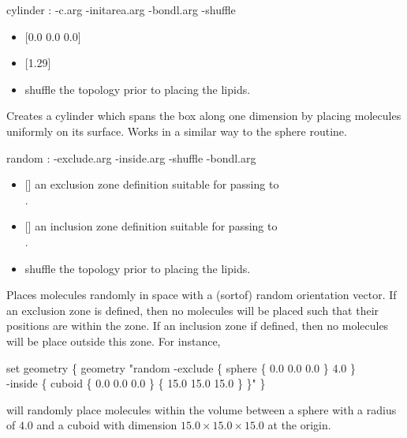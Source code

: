 \begin{code}
  cylinder : -c.arg -initarea.arg -bondl.arg -shuffle
\end{code}
\begin{itemize}
\item {} [{0.0 0.0 0.0}]
\item {} [1.29]
\item {} shuffle the topology prior to placing the lipids.
\end{itemize}
Creates a cylinder which spans the box along one dimension by placing
molecules uniformly on its surface. Works in a similar way to the
sphere routine.

\begin{code}
  random : -exclude.arg -inside.arg -shuffle -bondl.arg
\end{code}
\begin{itemize}
  \item {} [] an exclusion zone definition suitable for passing to\\
 .
  \item {} [] an inclusion zone definition suitable for passing to\\
 .
  \item {} shuffle the topology prior to placing the lipids.
  \end{itemize}
  Places molecules randomly in space with a (sortof) random
  orientation vector. If an exclusion zone is defined, then no
  molecules will be placed such that their positions are within the
  zone. If an inclusion zone if defined, then no molecules will be
  place outside this zone. For instance,
\begin{code}
  set geometry \{ geometry "random -exclude \{ sphere \{ 0.0 0.0 0.0 \} 4.0 \}\\
                -inside \{ cuboid \{ 0.0 0.0 0.0 \} \{ 15.0 15.0 15.0 \} \}" \}\\
\end{code}
will randomly place molecules within the volume between a sphere with
a radius of $4.0$ and a cuboid with dimension $15.0 \times 15.0 \times
15.0 $ at the origin.


